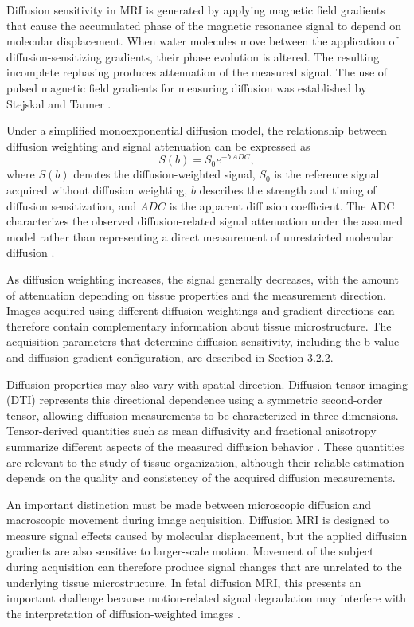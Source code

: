 Diffusion sensitivity in MRI is generated by applying magnetic field gradients that cause the accumulated phase of the magnetic resonance signal to depend on molecular displacement. When water molecules move between the application of diffusion-sensitizing gradients, their phase evolution is altered. The resulting incomplete rephasing produces attenuation of the measured signal. The use of pulsed magnetic field gradients for measuring diffusion was established by Stejskal and Tanner \autocite{stejskal1965diffusion}.

Under a simplified monoexponential diffusion model, the relationship between diffusion weighting and signal attenuation can be expressed as
\begin{equation}
S(b) = S_0 e^{-b\,ADC},
\end{equation}
where $S(b)$ denotes the diffusion-weighted signal, $S_0$ is the reference signal acquired without diffusion weighting, $b$ describes the strength and timing of diffusion sensitization, and $ADC$ is the apparent diffusion coefficient. The ADC characterizes the observed diffusion-related signal attenuation under the assumed model rather than representing a direct measurement of unrestricted molecular diffusion \autocite{lebihan1986ivim}.

As diffusion weighting increases, the signal generally decreases, with the amount of attenuation depending on tissue properties and the measurement direction. Images acquired using different diffusion weightings and gradient directions can therefore contain complementary information about tissue microstructure. The acquisition parameters that determine diffusion sensitivity, including the b-value and diffusion-gradient configuration, are described in Section 3.2.2.

Diffusion properties may also vary with spatial direction. Diffusion tensor imaging (DTI) represents this directional dependence using a symmetric second-order tensor, allowing diffusion measurements to be characterized in three dimensions. Tensor-derived quantities such as mean diffusivity and fractional anisotropy summarize different aspects of the measured diffusion behavior \autocite{basser1994tensor}. These quantities are relevant to the study of tissue organization, although their reliable estimation depends on the quality and consistency of the acquired diffusion measurements.

An important distinction must be made between microscopic diffusion and macroscopic movement during image acquisition. Diffusion MRI is designed to measure signal effects caused by molecular displacement, but the applied diffusion gradients are also sensitive to larger-scale motion. Movement of the subject during acquisition can therefore produce signal changes that are unrelated to the underlying tissue microstructure. In fetal diffusion MRI, this presents an important challenge because motion-related signal degradation may interfere with the interpretation of diffusion-weighted images \autocite{malamateniou2013motion,snoussi2025haitch}.

